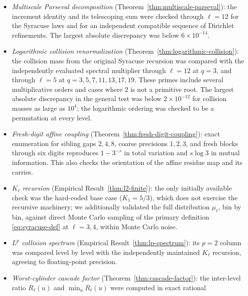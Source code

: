 \documentclass[11pt]{article}
\theoremstyle{definition}
\theoremstyle{remark}
\begin{document}
\begin{itemize}
  (Proposition~\ref{prop:primitive-fibre-energy}): random integer count
  vectors through $\ell=8$ satisfy \eqref{eq:primitive-fibre-energy}
  with absolute discrepancy below $3\times10^{-16}$. Uniform lifts
  give zero primitive energy at every tested level. The computation
  also checks the sharp integer-count bound $1/T$.
\item \emph{Multiscale Parseval decomposition}
  (Theorem~\ref{thm:multiscale-parseval}): the increment identity and
  its telescoping sum were checked through $\ell=12$ for the Syracuse
  laws and for an independent compatible sequence of Dirichlet
  refinements. The largest absolute discrepancy was below
  $6\times10^{-14}$.
\item \emph{Logarithmic collision renormalization}
  (Theorem~\ref{thm:logarithmic-collision}): the collision mass from
  the original Syracuse recursion was compared with the independently
  evaluated spectral multiplier through $\ell=12$ at $q=3$, and
  through $\ell=5$ at $q=3,5,7,11,13,17,19$. These primes include
  several multiplicative orders and cases where $2$ is not a primitive
  root. The largest absolute discrepancy in the general test was below
  $2\times10^{-12}$ for collision masses as large as $10^4$; the
  logarithmic ordering was checked to be a permutation at every level.
\item \emph{Fresh-digit affine coupling}
  (Theorem~\ref{thm:fresh-digit-coupling}): exact enumeration for
  sibling gaps $2,4,8$, coarse precisions $1,2,3$, and fresh blocks
  through six digits reproduces $1-3^{-s}$ in total variation and
  $s\log3$ in mutual information. This also checks the orientation of
  the affine residue map and its carries.
\item \emph{$K_\ell$ recursion} (Empirical Result~\ref{thm:l2-finite}): the
  only initially available check was the hard-coded base case
  ($K_1=5/3$), which does not exercise the recursive machinery; we
  additionally validated the full distribution $\mu_\ell$, bin by bin,
  against direct Monte Carlo sampling of the primary definition
  \eqref{eq:syracuse-def} at $\ell=3,4$, within Monte Carlo noise.
\item \emph{$L^p$ collision spectrum}
  (Empirical Result~\ref{thm:lp-spectrum}): its $p=2$ column was
  compared level by level with the independently maintained
  $K_\ell$ recursion, agreeing to floating-point precision.
\item \emph{Worst-cylinder cascade factor}
  (Theorem~\ref{thm:cascade-factor}): the inter-level ratio
  $R_\ell(u)$ and $\min_u R_\ell(u)$ were computed in exact rational

\end{itemize}
\end{document}
